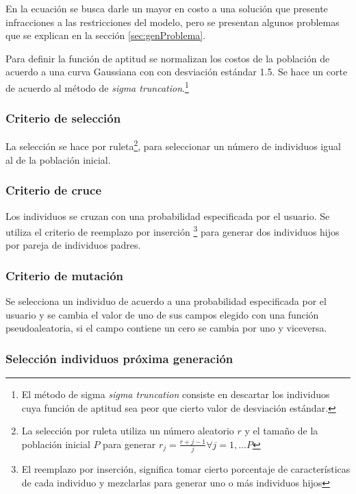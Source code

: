 En la ecuación se busca darle un mayor en costo a una solución que presente infracciones a las restricciones del modelo, pero se presentan algunos problemas que se explican en la sección \ref{sec:genProblema}.

Para definir la función de aptitud se normalizan los costos de la población de acuerdo a una curva Gaussiana con con desviación estándar 1.5.
Se hace un corte de acuerdo al método de \textit{sigma truncation}\cite{Truncation}.\footnote{El método de sigma \textit{sigma truncation} consiste en descartar los individuos cuya función de aptitud sea peor que cierto valor de desviación estándar.}

\subsubsection{Criterio de selección}

La selección se hace por ruleta\footnote{La selección por ruleta utiliza un número aleatorio $r$ y el tamaño de la población inicial $P$ para generar $r_{j}=\frac{r+j-1}{j} \forall j=1,...P$}, para seleccionar un número de individuos igual al de la población inicial.

\subsubsection{Criterio de cruce}

Los individuos se cruzan con una probabilidad especificada por el usuario. Se utiliza el criterio de reemplazo por inserción \footnote{El reemplazo por inserción, significa tomar cierto porcentaje de características de cada individuo y mezclarlas para generar uno o más individuos hijos} para generar dos individuos hijos por pareja de individuos padres.

\subsubsection{Criterio de mutación}

Se selecciona un individuo de acuerdo a una probabilidad especificada por el usuario y se cambia el valor de uno de sus campos elegido con una función pseudoaleatoria, si el campo contiene un cero se cambia por uno y viceversa.

\subsubsection{Selección individuos próxima generación}

